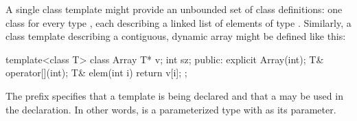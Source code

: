 \pnum
\begin{example}
A single class template
might provide an unbounded set of class definitions:
one class  for every type ,
each describing a linked list of elements of type .
Similarly, a class template  describing a contiguous,
dynamic array might be defined like this:
\begin{codeblock}
template<class T> class Array {
  T* v;
  int sz;
public:
  explicit Array(int);
  T& operator[](int);
  T& elem(int i) { return v[i]; }
};
\end{codeblock}
The prefix 
specifies that a template is being declared and that a
may be used in the declaration.
In other words,
is a parameterized type with
as its parameter.
\end{example}


